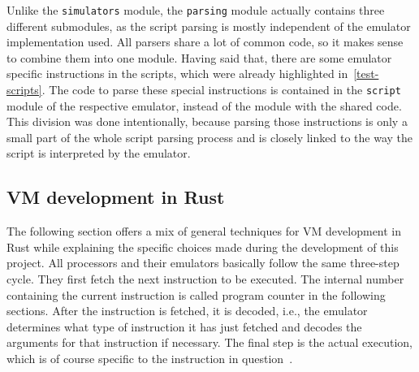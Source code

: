 Unlike the \verb+simulators+ module, the \verb+parsing+ module actually contains three different submodules, as the script parsing is mostly independent of the emulator implementation used.
All parsers share a lot of common code, so it makes sense to combine them into one module.
Having said that, there are some emulator specific instructions in the scripts, which were already highlighted in~\cref{test-scripts}.
The code to parse these special instructions is contained in the \verb+script+ module of the respective emulator, instead of the module with the shared code.
This division was done intentionally, because parsing those instructions is only a small part of the whole script parsing process and is closely linked to the way the script is interpreted by the emulator.

\subsection{VM development in Rust} \label{rust-vm-dev}
The following section offers a mix of general techniques for VM development in Rust while explaining the specific choices made during the development of this project.
All processors and their emulators basically follow the same three-step cycle.
They first fetch the next instruction to be executed.
The internal number containing the current instruction is called program counter in the following sections.
After the instruction is fetched, it is decoded, i.e., the emulator determines what type of instruction it has just fetched and decodes the arguments for that instruction if necessary.
The final step is the actual execution, which is of course specific to the instruction in question~\cite{nystrom2021crafting}.

